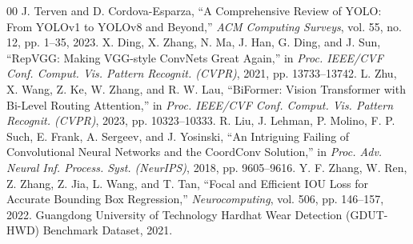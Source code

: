 \documentclass[conference]{IEEEtran}
\begin{document}
\begin{thebibliography}{00}
 J. Terven and D. Cordova-Esparza, ``A Comprehensive Review of YOLO: From YOLOv1 to YOLOv8 and Beyond,'' \textit{ACM Computing Surveys}, vol. 55, no. 12, pp. 1--35, 2023.
 X. Ding, X. Zhang, N. Ma, J. Han, G. Ding, and J. Sun, ``RepVGG: Making VGG-style ConvNets Great Again,'' in \textit{Proc. IEEE/CVF Conf. Comput. Vis. Pattern Recognit. (CVPR)}, 2021, pp. 13733--13742.
 L. Zhu, X. Wang, Z. Ke, W. Zhang, and R. W. Lau, ``BiFormer: Vision Transformer with Bi-Level Routing Attention,'' in \textit{Proc. IEEE/CVF Conf. Comput. Vis. Pattern Recognit. (CVPR)}, 2023, pp. 10323--10333.
 R. Liu, J. Lehman, P. Molino, F. P. Such, E. Frank, A. Sergeev, and J. Yosinski, ``An Intriguing Failing of Convolutional Neural Networks and the CoordConv Solution,'' in \textit{Proc. Adv. Neural Inf. Process. Syst. (NeurIPS)}, 2018, pp. 9605--9616.
 Y. F. Zhang, W. Ren, Z. Zhang, Z. Jia, L. Wang, and T. Tan, ``Focal and Efficient IOU Loss for Accurate Bounding Box Regression,'' \textit{Neurocomputing}, vol. 506, pp. 146--157, 2022.
 Guangdong University of Technology Hardhat Wear Detection (GDUT-HWD) Benchmark Dataset, 2021.
\end{thebibliography}
\end{document}
